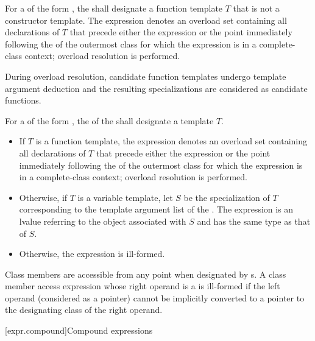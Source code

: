 \pnum
For a  of
the form ,
the  shall designate a function template $T$
that is not a constructor template.
The expression denotes an overload set containing all declarations of $T$
that precede either the expression or
the point immediately following the  of
the outermost class for which the expression is in a complete-class context;
overload resolution is performed.
\begin{note}
During overload resolution,
candidate function templates undergo template argument deduction and
the resulting specializations are considered as candidate functions.
\end{note}

\pnum
For a  of
the form ,
the  of
the 
shall designate a template $T$.
\begin{itemize}
\item
If $T$ is a function template,
the expression denotes an overload set containing all declarations of $T$
that precede either the expression or
the point immediately following the  of
the outermost class for which the expression is in a complete-class context;
overload resolution is performed.
\item
Otherwise, if $T$ is a variable template,
let $S$ be the specialization of $T$ corresponding to
the template argument list of the .
The expression is an lvalue referring to
the object associated with $S$ and has the same type as that of $S$.
\item
Otherwise, the expression is ill-formed.
\end{itemize}
\begin{note}
Class members are accessible from any point
when designated by s.
A class member access expression
whose right operand is a  is ill-formed
if the left operand (considered as a pointer) cannot be implicitly converted
to a pointer to the designating class of the right operand.
\end{note}

[expr.compound]{Compound expressions}

